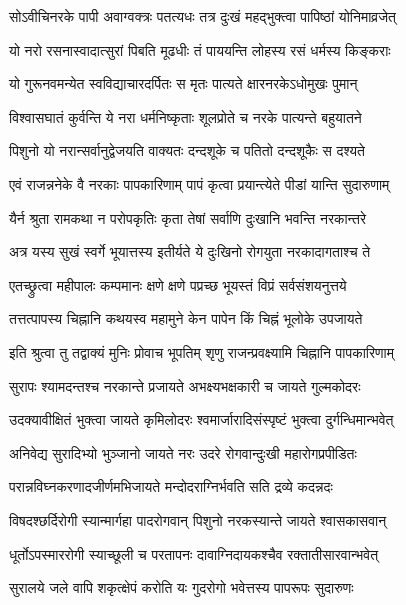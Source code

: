 \twolineshloka
{सोऽवीचिनरके पापी अवाग्वक्त्रः पतत्यधः}
{तत्र दुःखं महद्भुक्त्वा पापिष्ठां योनिमाव्रजेत्}%

\twolineshloka
{यो नरो रसनास्वादात्सुरां पिबति मूढधीः}
{तं पाययन्ति लोहस्य रसं धर्मस्य किङ्कराः}%

\twolineshloka
{यो गुरूनवमन्येत स्वविद्याचारदर्पितः}
{स मृतः पात्यते क्षारनरकेऽधोमुखः पुमान्}%

\twolineshloka
{विश्वासघातं कुर्वन्ति ये नरा धर्मनिष्कृताः}
{शूलप्रोते च नरके पात्यन्ते बहुयातने}%

\twolineshloka
{पिशुनो यो नरान्सर्वानुद्वेजयति वाक्यतः}
{दन्दशूके च पतितो दन्दशूकैः स दश्यते}%

\twolineshloka
{एवं राजन्ननेके वै नरकाः पापकारिणाम्}
{पापं कृत्वा प्रयान्त्येते पीडां यान्ति सुदारुणाम्}%

\twolineshloka
{यैर्न श्रुता रामकथा न परोपकृतिः कृता}
{तेषां सर्वाणि दुःखानि भवन्ति नरकान्तरे}%

\twolineshloka
{अत्र यस्य सुखं स्वर्गे भूयात्तस्य इतीर्यते}
{ये दुःखिनो रोगयुता नरकादागताश्च ते}%


\twolineshloka
{एतच्छ्रुत्वा महीपालः कम्पमानः क्षणे क्षणे}
{पप्रच्छ भूयस्तं विप्रं सर्वसंशयनुत्तये}%

\twolineshloka
{तत्तत्पापस्य चिह्नानि कथयस्व महामुने}
{केन पापेन किं चिह्नं भूलोके उपजायते}%

\twolineshloka
{इति श्रुत्वा तु तद्वाक्यं मुनिः प्रोवाच भूपतिम्}
{शृणु राजन्प्रवक्ष्यामि चिह्नानि पापकारिणाम्}%


\twolineshloka
{सुरापः श्यामदन्तश्च नरकान्ते प्रजायते}
{अभक्ष्यभक्षकारी च जायते गुल्मकोदरः}%

\twolineshloka
{उदक्यावीक्षितं भुक्त्वा जायते कृमिलोदरः}
{श्वमार्जारादिसंस्पृष्टं भुक्त्वा दुर्गन्धिमान्भवेत्}%

\twolineshloka
{अनिवेद्य सुरादिभ्यो भुञ्जानो जायते नरः}
{उदरे रोगवान्दुःखी महारोगप्रपीडितः}%

\twolineshloka
{परान्नविघ्नकरणादजीर्णमभिजायते}
{मन्दोदराग्निर्भवति सति द्रव्ये कदन्नदः}%

\twolineshloka
{विषदश्छर्दिरोगी स्यान्मार्गहा पादरोगवान्}
{पिशुनो नरकस्यान्ते जायते श्वासकासवान्}%

\twolineshloka
{धूर्तोऽपस्माररोगी स्याच्छूली च परतापनः}
{दावाग्निदायकश्चैव रक्तातीसारवान्भवेत्}%

\twolineshloka
{सुरालये जले वापि शकृत्क्षेपं करोति यः}
{गुदरोगो भवेत्तस्य पापरूपः सुदारुणः}%

